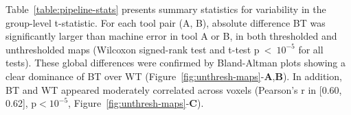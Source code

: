 \documentclass[11pt,onecolumn]{article}
\begin{document}
Table~\ref{table:pipeline-stats} presents summary statistics for variability in the
group-level t-statistic. For each tool pair (A, B), absolute difference BT was
significantly larger than machine error in tool A or B, in both thresholded
and unthresholded maps (Wilcoxon signed-rank test and t-test p~\textless~$10^{-5}$ for all tests).
These global differences were confirmed by Bland-Altman plots showing a
clear dominance of BT over WT
(Figure~\ref{fig:unthresh-maps}-\textbf{A},\textbf{B}).
In addition, BT and WT appeared moderately correlated across voxels (Pearson's r
in [0.60, 0.62], p$< 10^{-5}$, Figure~\ref{fig:unthresh-maps}-\textbf{C}). 
\end{document}

